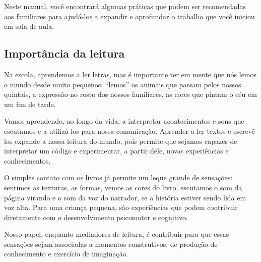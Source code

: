 \documentclass[11pt]{extarticle}
\begin{document}
Neste manual, você encontrará algumas práticas que podem ser 
recomendadas aos familiares para ajudá-los a expandir e aprofundar o trabalho 
que você iniciou em sala de aula.


\subsection{Importância da leitura}
Na escola, aprendemos a ler letras, mas é importante ter em mente que nós 
lemos o mundo desde muito pequenos: “lemos” os animais que passam pelos nossos 
quintais, a expressão no rosto dos nossos familiares, as cores que pintam o céu 
em um fim de tarde. 


Vamos aprendendo, ao longo da vida, a interpretar acontecimentos 
e sons que escutamos e a utilizá-los para nossa comunicação. Aprender a ler textos e 
escrevê-los expande a nossa leitura do mundo, pois permite que sejamos capazes de 
interpretar um código e experimentar, a partir dele, novas experiências e conhecimentos. 

O simples contato com os livros já permite um leque grande de sensações: 
sentimos as texturas, as formas, vemos as cores do livro, escutamos o som da página 
virando e o som da voz do narrador, se a história estiver sendo lida em voz alta. Para uma 
criança pequena, são experiências que podem contribuir diretamente com o desenvolvimento psicomotor 
e cognitivo. 

Nosso papel, enquanto mediadores de leitura, é contribuir para que essas 
sensações sejam associadas a momentos construtivos, de produção de 
conhecimento e exercício de imaginação. 
\end{document}

